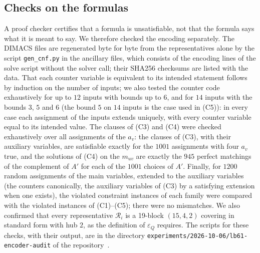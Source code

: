 \documentclass[11pt]{amsart}
\theoremstyle{definition}
\theoremstyle{remark}
\newcommand{\cR}{\mathcal{R}}
\begin{document}
\subsection*{Checks on the formulas}
A proof checker certifies that a formula is unsatisfiable, not that the
formula says what it is meant to say. We therefore checked the encoding
separately. The DIMACS files are regenerated byte for byte from the
representatives alone by the script \texttt{gen\_cnf.py} in the ancillary
files, which consists of the encoding lines of the solve script without the
solver call; their SHA256 checksums are listed with the data. That each
counter variable is equivalent to its intended statement follows by induction
on the number of inputs; we also tested the counter code exhaustively for up
to $12$ inputs with bounds up to $6$, and for $14$ inputs with the bounds $3$,
$5$ and $6$ (the bound $5$ on $14$ inputs is the case used in (C5)): in every
case each assignment of the inputs extends uniquely, with every counter
variable equal to its intended value. The clauses of (C3) and (C4) were checked
exhaustively over all assignments of the $a_v$: the clauses of (C3), with
their auxiliary variables, are satisfiable exactly for the $1001$ assignments
with four $a_v$ true, and the solutions of (C4) on the $m_{uv}$ are exactly
the $945$ perfect matchings of the complement of $A'$ for each of the $1001$
choices of $A'$. Finally, for $1200$ random assignments of the main
variables, extended to the auxiliary variables (the counters canonically, the
auxiliary variables of (C3) by a satisfying extension when one exists), the violated
constraint instances of each family were compared with the violated instances
of (C1)--(C5); there were no mismatches. We also confirmed that every
representative $\cR_i$ is a 19-block $(15,4,2)$ covering in standard form with
hub $2$, as the definition of $\varepsilon_Q$ requires. The scripts for these
checks, with their output, are in the directory
\nolinkurl{experiments/2026-10-06/lb61-encoder-audit} of the
repository~\cite{covering64repo}.
\end{document}
